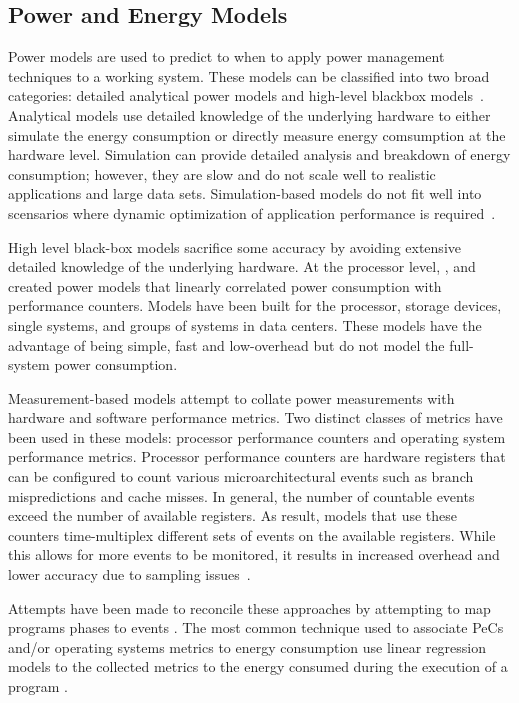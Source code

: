 \documentclass[]{sig-alternate-hotpower09}
\begin{document}
\subsection{Power and Energy Models}
\label{sec:models}
Power models are used to predict to when to apply power management
techniques to a working system. These models can be classified into two
broad categories: detailed analytical power models and high-level
blackbox models~\cite{Rivoire2008b}. Analytical models use detailed
knowledge of the underlying hardware to either simulate the energy
consumption or directly measure energy comsumption at the hardware
level.  Simulation can provide detailed analysis and breakdown of energy
consumption; however, they are slow and do not scale well to realistic
applications and large data sets.  Simulation-based models do not fit
well into scensarios where dynamic optimization of application
performance is required~\cite{Economou2006}. 

High level black-box models sacrifice some accuracy by avoiding
extensive detailed knowledge of the underlying hardware.  At the
processor level, \cite{Contreras2005}, and \cite{Bellosa2003} created
power models that linearly correlated power consumption with performance
counters. Models have been built for the processor, storage devices,
single systems, and groups of systems in data centers.  These models
have the advantage of being simple, fast and low-overhead but do not
model the full-system power consumption.

Measurement-based models attempt to collate power measurements with
hardware and software performance metrics.  Two distinct classes of
metrics have been used in these models: processor performance counters
and operating system performance metrics.  Processor performance
counters are hardware registers that can be configured to count various
microarchitectural events such as branch mispredictions and cache
misses.  In general, the number of countable events exceed the number of
available registers.  As result, models that use these counters
time-multiplex different sets of events on the available registers.
While this allows for more events to be monitored, it results in
increased overhead and lower accuracy due to sampling
issues~\cite{Economou2006}\cite{Rivoire2008a}.

Attempts have been made to reconcile these approaches by attempting to
map programs phases to events \cite{Isci2006}.  The most common
technique used to associate PeCs and/or operating systems metrics to
energy consumption use linear regression models to the collected metrics
to the energy consumed during the execution of a program
\cite{Contreras2005}\cite{Economou2006}\cite{Isci2003b}\cite{Bircher2007}.
\end{document}
